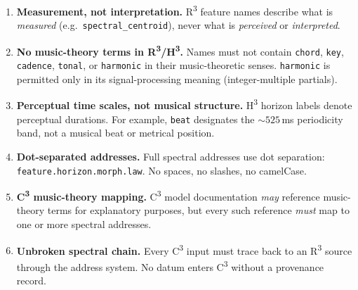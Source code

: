 \begin{enumerate}
    \item \textbf{Measurement, not interpretation.}\enspace
          R\textsuperscript{3} feature names describe what is \emph{measured}
          (e.g.\ \texttt{spectral\_centroid}), never what is
          \emph{perceived} or \emph{interpreted}.

    \item \textbf{No music-theory terms in R\textsuperscript{3}/H\textsuperscript{3}.}\enspace
          Names must not contain \texttt{chord}, \texttt{key},
          \texttt{cadence}, \texttt{tonal}, or \texttt{harmonic}
          in their music-theoretic senses.
          \texttt{harmonic} is permitted only in its signal-processing
          meaning (integer-multiple partials).

    \item \textbf{Perceptual time scales, not musical structure.}\enspace
          H\textsuperscript{3} horizon labels denote perceptual durations.
          For example, \texttt{beat} designates the ${\sim}525$\,ms
          periodicity band, not a musical beat or metrical position.

    \item \textbf{Dot-separated addresses.}\enspace
          Full spectral addresses use dot separation:
          \texttt{feature.horizon.morph.law}.
          No spaces, no slashes, no camelCase.

    \item \textbf{C\textsuperscript{3} music-theory mapping.}\enspace
          C\textsuperscript{3} model documentation \emph{may} reference
          music-theory terms for explanatory purposes, but every such
          reference \emph{must} map to one or more spectral addresses.

    \item \textbf{Unbroken spectral chain.}\enspace
          Every C\textsuperscript{3} input must trace back to an
          R\textsuperscript{3} source through the address system.
          No datum enters C\textsuperscript{3} without a provenance record.
\end{enumerate}
